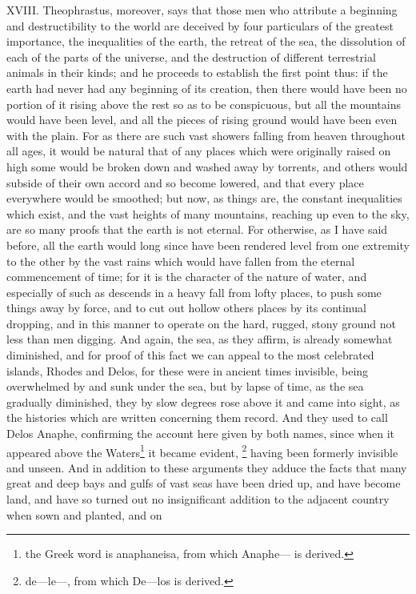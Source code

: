 XVIII. Theophrastus, moreover, says that those men who attribute a beginning and destructibility to
the world are deceived by four particulars of the greatest importance, the inequalities of the earth,
the retreat of the sea, the dissolution of each of the parts of the universe, and the destruction of
different terrestrial animals in their kinds; and he proceeds to establish the first point thus: if the
earth had never had any beginning of its creation, then there would have been no portion of it rising
above the rest so as to be conspicuous, but all the mountains would have been level, and all the
pieces of rising ground would have been even with the plain. For as there are such vast showers
falling from heaven throughout all ages, it would be natural that of any places which were originally
raised on high some would be broken down and washed away by torrents, and others would
subside of their own accord and so become lowered, and that every place everywhere would be
smoothed; but now, as things are, the constant inequalities which exist, and the vast heights of
many mountains, reaching up even to the sky, are so many proofs that the earth is not eternal. For
otherwise, as I have said before, all the earth would long since have been rendered level from one
extremity to the other by the vast rains which would have fallen from the eternal commencement of
time; for it is the character of the nature of water, and especially of such as descends in a heavy
fall from lofty places, to push some things away by force, and to cut out hollow others places by its
continual dropping, and in this manner to operate on the hard, rugged, stony ground not less than
men digging. And again, the sea, as they affirm, is already somewhat diminished, and for proof of
this fact we can appeal to the most celebrated islands, Rhodes and Delos, for these were in
ancient times invisible, being overwhelmed by and sunk under the sea, but by lapse of time, as the
sea gradually diminished, they by slow degrees rose above it and came into sight, as the histories
which are written concerning them record. And they used to call Delos Anaphe, confirming the
account here given by both names, since when it appeared above the Waters\footnote{the Greek word is
anaphaneisa, from which Anaphe— is derived.} it became evident, \footnote{de—le—, from which De—los is derived.} having
been formerly invisible and unseen. And in addition to these arguments they adduce the facts that
many great and deep bays and gulfs of vast seas have been dried up, and have become land, and
have so turned out no insignificant addition to the adjacent country when sown and planted, and on
